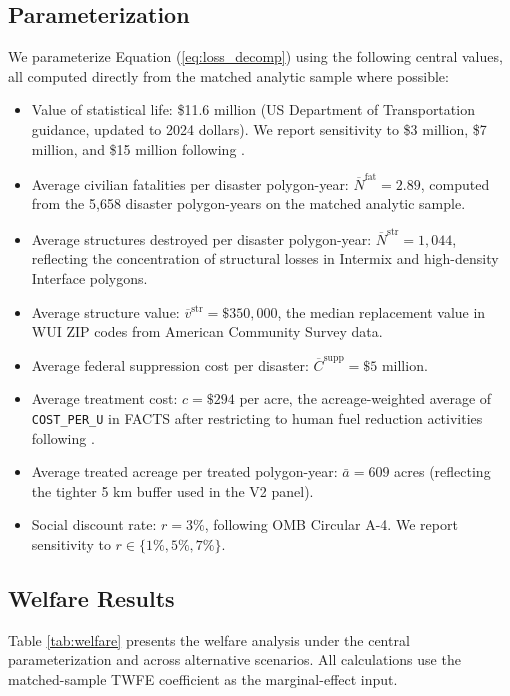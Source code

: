 \documentclass[12pt, letterpaper]{article}
\begin{document}
\subsection{Parameterization}

We parameterize Equation (\ref{eq:loss_decomp}) using the following central values, all computed directly from the matched analytic sample where possible:
\begin{itemize}[leftmargin=*, itemsep=0.2em]
\item Value of statistical life: \$11.6 million (US Department of Transportation guidance, updated to 2024 dollars). We report sensitivity to \$3 million, \$7 million, and \$15 million following \citet{viscusi2018}.
\item Average civilian fatalities per disaster polygon-year: $\overline{N}^{\text{fat}} = 2.89$, computed from the 5{,}658 disaster polygon-years on the matched analytic sample.
\item Average structures destroyed per disaster polygon-year: $\overline{N}^{\text{str}} = 1{,}044$, reflecting the concentration of structural losses in Intermix and high-density Interface polygons.
\item Average structure value: $\overline{v}^{\text{str}} = \$350{,}000$, the median replacement value in WUI ZIP codes from American Community Survey data.
\item Average federal suppression cost per disaster: $\overline{C}^{\text{supp}} = \$5$ million.
\item Average treatment cost: $c = \$294$ per acre, the acreage-weighted average of \texttt{COST\_PER\_U} in FACTS after restricting to human fuel reduction activities following \citet{wear2025}.
\item Average treated acreage per treated polygon-year: $\bar{a} = 609$ acres (reflecting the tighter 5 km buffer used in the V2 panel).
\item Social discount rate: $r = 3\%$, following OMB Circular A-4. We report sensitivity to $r \in \{1\%, 5\%, 7\%\}$.
\end{itemize}

\subsection{Welfare Results}

Table \ref{tab:welfare} presents the welfare analysis under the central parameterization and across alternative scenarios. All calculations use the matched-sample TWFE coefficient as the marginal-effect input.
\end{document}

